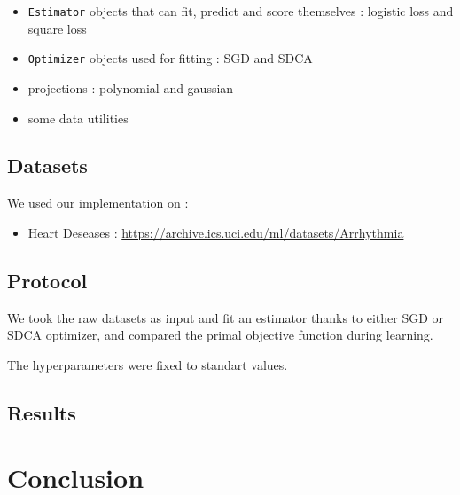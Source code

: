 \documentclass{article}
\begin{document}
\begin{itemize}
	\item \texttt{Estimator} objects that can fit, predict and score themselves : logistic loss and square loss
	\item \texttt{Optimizer} objects used for fitting : SGD and SDCA
	\item projections : polynomial and gaussian
	\item some data utilities
\end{itemize}

\subsection{Datasets}

We used our implementation on :

\begin{itemize}
	\item Heart Deseases : \url{https://archive.ics.uci.edu/ml/datasets/Arrhythmia}
\end{itemize}

\subsection{Protocol}

We took the raw datasets as input and fit an estimator thanks to either SGD or SDCA optimizer, and compared the primal objective function during learning.

The hyperparameters were fixed to standart values.

\subsection{Results}




\section*{Conclusion}


\end{document}
